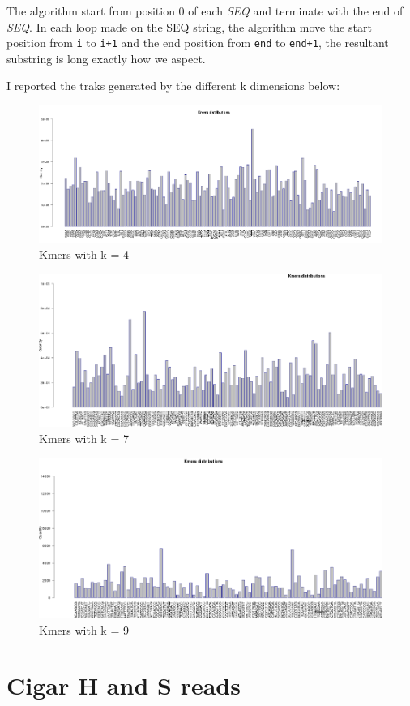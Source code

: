 The algorithm start from position 0 of each \emph{SEQ} and terminate with the end of \emph{SEQ}.
In each loop made on the SEQ string, the algorithm move the start position from \verb|i| to \verb|i+1| and the end position from \verb|end| to \verb|end+1|, the resultant substring is long exactly how we aspect.

I reported the traks generated by the different k dimensions below:

 \begin{figure}[H]
				\centering
				\includegraphics[scale=0.45]{immagini/kmers_4.png}
				\caption{Kmers with k = 4}\label{fig:12}
				\end{figure}


 \begin{figure}[H]
				\centering
				\includegraphics[scale=0.45]{immagini/kmers_7.png}
				\caption{Kmers with k = 7}\label{fig:13}
				\end{figure}
				
				
				
 \begin{figure}[H]
				\centering
				\includegraphics[scale=0.45]{immagini/kmers_9.png}
				\caption{Kmers with k = 9}\label{fig:14}
				\end{figure}	

\section{Cigar H and S reads}